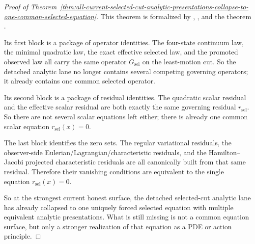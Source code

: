 \begin{proof}[Proof of Theorem~\ref{thm:all-current-selected-cut-analytic-presentations-collapse-to-one-common-selected-equation}]
\label{proof:thm:all-current-selected-cut-analytic-presentations-collapse-to-one-common-selected-equation}
This theorem is formalized by
,
, and the theorem
.

Its first block is a package of operator identities. The four-state continuum
law, the minimal quadratic law, the exact effective selected law, and the
promoted observed law all carry the same operator \(G_{\mathrm{sel}}\) on the
least-motion cut. So the detached analytic lane no longer contains several
competing governing operators; it already contains one common selected
operator.

Its second block is a package of residual identities. The quadratic scalar
residual and the effective scalar residual are both exactly the same governing
residual \(r_{\mathrm{sel}}\). So there are not several scalar equations left
either; there is already one common scalar equation
\(r_{\mathrm{sel}}(x)=0\).

The last block identifies the zero sets. The regular variational residuals,
the observer-side Eulerian/Lagrangian/characteristic residuals, and the
Hamilton--Jacobi projected characteristic residuals are all canonically built
from that same residual. Therefore their vanishing conditions are equivalent
to the single equation \(r_{\mathrm{sel}}(x)=0\).

So at the strongest current honest surface, the detached selected-cut analytic
lane has already collapsed to one uniquely forced selected equation with
multiple equivalent analytic presentations. What is still missing is not a
common equation surface, but only a stronger realization of that equation as a
PDE or action principle.
\end{proof}

